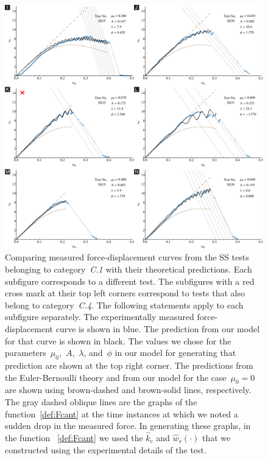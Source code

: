 \documentclass[preprint,10pt,times]{elsarticle}
\numberwithin{equation}{section}
\begin{document}
\begin{figure}
\begin{centering}
\includegraphics[width=1\textwidth]{../Figures_Submit/Cat1Sub2.pdf}
\par\end{centering}
\caption{
\label{fig:Cat1}
Comparing measured force-displacement curves from the SS tests belonging to category~\textit{C.1} with their theoretical predictions.
Each subfigure corresponds to a different test.
The subfigures with a red cross mark at their top left corners correspond to tests that also belong to category~\textit{C.4}.
The following statements apply to each subfigure separately.
The experimentally measured force-displacement curve is shown in blue.
The prediction from our model for that curve is shown in black.
The values we chose for the parameters~$\mu_0$,~$A$,~$\lambda$, and~$\phi$ in our model for generating that prediction are shown at the top right corner.
The predictions from the Euler-Bernoulli theory and from our model for the case~$\mu_0 = 0$ are shown using brown-dashed and brown-solid lines, respectively.
The gray dashed oblique lines are the graphs of the  function~\eqref{def:Fcant} at the time instances at which we noted a sudden drop in the measured force.
In  generating these graphs, in the function ~\eqref{def:Fcant} we used the $\hat{k}_c$  and $\hat{w}_s(\cdot)$ that we constructed using the experimental details of the  test.
}
\end{figure}
\end{document}
